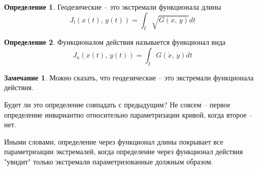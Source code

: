 \documentclass[a4paper,12pt]{article}
\theoremstyle{plain}
\theoremstyle{definition}
\newtheorem{definition}{Определение}[section]
\newtheorem*{note}{Замечание}
\theoremstyle{remark}
\begin{document}
\begin{definition}
	Геодезические -- это экстремали функционала длины
	\[J_l(x(t),\,y(t)) = \int_I\sqrt{G(\dot{x},\,\dot{y})}dt\]
\end{definition}

\begin{definition}
	Функционалом действия называется функционал вида
	\[J_a(x(t),\,y(t)) = \int_I G(\dot{x},\,\dot{y})dt\]
\end{definition}

\begin{note}
	Можно сказать, что геодезические -- это экстремали функционала действия.

	Будет ли это определение совпадать с предыдущим? Не совсем -- первое определение инвариантно относительно параметризации кривой, когда второе -- нет.

	Иными словами, определение через функционал длины покрывает все параметризации экстремалей, когда определение через функционал действия "увидит" только экстремали параметризованные должным образом.
\end{note}
\end{document}
